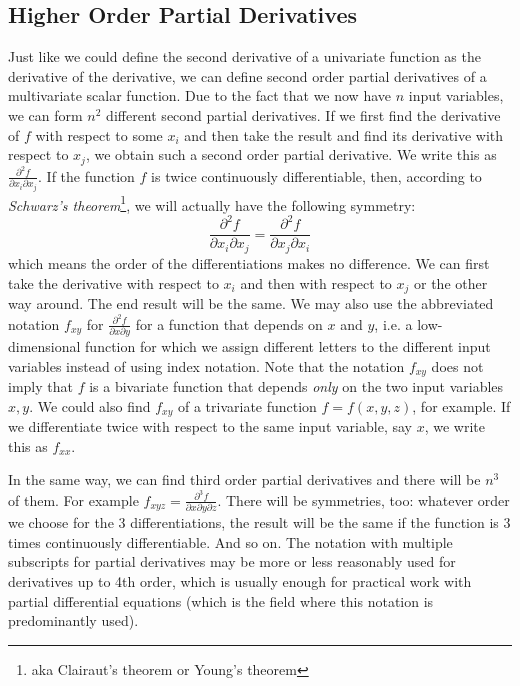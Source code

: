\subsection{Higher Order Partial Derivatives}
Just like we could define the second derivative of a univariate function as the derivative of the derivative, we can define second order partial derivatives of a multivariate scalar function. Due to the fact that we now have $n$ input variables, we can form $n^2$ different second partial derivatives. If we first find the derivative of $f$ with respect to some $x_i$ and then take the result and find its derivative with respect to $x_j$, we obtain such a second order partial derivative. We write this as $\frac{\partial^2 f}{\partial x_i \partial x_j}$. If the function $f$ is twice continuously differentiable, then, according to \emph{Schwarz's theorem}\footnote{aka Clairaut's theorem or Young's theorem}, we will actually have the following symmetry:
\begin{equation}
	\frac{\partial^2 f}{\partial x_i \partial x_j} 
	=
	\frac{\partial^2 f}{\partial x_j \partial x_i} 
\end{equation}
which means the order of the differentiations makes no difference. We can first take the derivative with respect to $x_i$ and then with respect to $x_j$ or the other way around. The end result will be the same. We may also use the abbreviated notation $f_{xy}$ for $\frac{\partial^2 f}{\partial x \partial y}$ for a function that depends on $x$ and $y$, i.e. a low-dimensional function for which we assign different letters to the different input variables instead of using index notation. Note that the notation $f_{xy}$ does not imply that $f$ is a bivariate function that depends \emph{only} on the two input variables $x,y$. We could also find $f_{xy}$ of a trivariate function $f = f(x,y,z)$, for example. If we differentiate twice with respect to the same input variable, say $x$, we write this as $f_{xx}$.

\medskip
In the same way, we can find third order partial derivatives and there will be $n^3$ of them. For example  $f_{xyz} = \frac{\partial^3 f}{\partial x \partial y \partial z}$. There will be symmetries, too: whatever order we choose for the 3 differentiations, the result will be the same if the function is 3 times continuously differentiable. And so on. The notation with multiple subscripts for partial derivatives may be more or less reasonably used for derivatives up to 4th order, which is usually enough for practical work with partial differential equations (which is the field where this notation is predominantly used).



